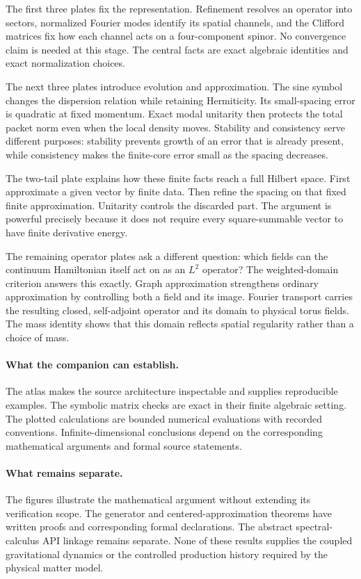 The first three plates fix the representation. Refinement resolves an operator into sectors, normalized Fourier modes identify its spatial channels, and the Clifford matrices fix how each channel acts on a four-component spinor. No convergence claim is needed at this stage. The central facts are exact algebraic identities and exact normalization choices.

The next three plates introduce evolution and approximation. The sine symbol changes the dispersion relation while retaining Hermiticity. Its small-spacing error is quadratic at fixed momentum. Exact modal unitarity then protects the total packet norm even when the local density moves. Stability and consistency serve different purposes: stability prevents growth of an error that is already present, while consistency makes the finite-core error small as the spacing decreases.

The two-tail plate explains how these finite facts reach a full Hilbert space. First approximate a given vector by finite data. Then refine the spacing on that fixed finite approximation. Unitarity controls the discarded part. The argument is powerful precisely because it does not require every square-summable vector to have finite derivative energy.

The remaining operator plates ask a different question: which fields can the continuum Hamiltonian itself act on as an $L^2$ operator? The weighted-domain criterion answers this exactly. Graph approximation strengthens ordinary approximation by controlling both a field and its image. Fourier transport carries the resulting closed, self-adjoint operator and its domain to physical torus fields. The mass identity shows that this domain reflects spatial regularity rather than a choice of mass.

\paragraph{What the companion can establish.}
The atlas makes the source architecture inspectable and supplies reproducible examples. The symbolic matrix checks are exact in their finite algebraic setting. The plotted calculations are bounded numerical evaluations with recorded conventions. Infinite-dimensional conclusions depend on the corresponding mathematical arguments and formal source statements.

\paragraph{What remains separate.}
The figures illustrate the mathematical argument without extending its verification scope. The generator and centered-approximation theorems have written proofs and corresponding formal declarations. The abstract spectral-calculus API linkage remains separate. None of these results supplies the coupled gravitational dynamics or the controlled production history required by the physical matter model.

\endgroup
